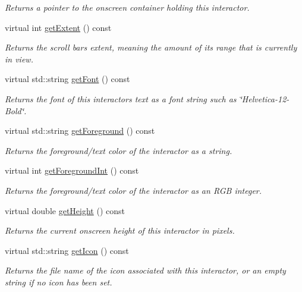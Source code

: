 \begin{DoxyCompactItemize}
\begin{DoxyCompactList}\small\item\em Returns a pointer to the onscreen container holding this interactor. \end{DoxyCompactList}\item 
virtual int \mbox{\hyperlink{classGScrollBar_af8d1d8c0338fae10ee8673e8430f6be8}{get\+Extent}} () const
\begin{DoxyCompactList}\small\item\em Returns the scroll bar\textquotesingle{}s extent, meaning the amount of its range that is currently in view. \end{DoxyCompactList}\item 
virtual std\+::string \mbox{\hyperlink{classGInteractor_a894a5502900794eeb27d084c21f1d77d}{get\+Font}} () const
\begin{DoxyCompactList}\small\item\em Returns the font of this interactor\textquotesingle{}s text as a font string such as \char`\"{}\+Helvetica-\/12-\/\+Bold\char`\"{}. \end{DoxyCompactList}\item 
virtual std\+::string \mbox{\hyperlink{classGInteractor_a4fa2d8b0192a3a5b4af4bbfe71194d03}{get\+Foreground}} () const
\begin{DoxyCompactList}\small\item\em Returns the foreground/text color of the interactor as a string. \end{DoxyCompactList}\item 
virtual int \mbox{\hyperlink{classGInteractor_ac3b12ab385a6ef9ae90fc879860ba726}{get\+Foreground\+Int}} () const
\begin{DoxyCompactList}\small\item\em Returns the foreground/text color of the interactor as an R\+GB integer. \end{DoxyCompactList}\item 
virtual double \mbox{\hyperlink{classGInteractor_a1e7e353362434072875264cf95629f99}{get\+Height}} () const
\begin{DoxyCompactList}\small\item\em Returns the current onscreen height of this interactor in pixels. \end{DoxyCompactList}\item 
virtual std\+::string \mbox{\hyperlink{classGInteractor_aaed62a73004939a64da6f0eb9eb64d73}{get\+Icon}} () const
\begin{DoxyCompactList}\small\item\em Returns the file name of the icon associated with this interactor, or an empty string if no icon has been set. \end{DoxyCompactList}\item 

\end{DoxyCompactItemize}
